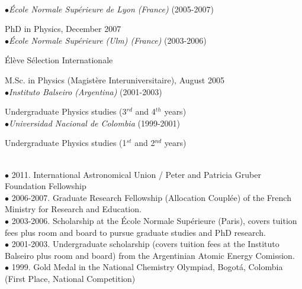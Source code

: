 \documentclass[10pt]{article}
\begin{document}
\\
\noindent\makebox[\linewidth]{\rule{\textwidth}{0.4pt}}%

\noindent$\bullet$\emph{\'Ecole Normale Sup\'erieure de Lyon (France)} (2005-2007)

PhD in Physics, December 2007\\

\noindent$\bullet$\emph{\'Ecole Normale Sup\'erieure (Ulm) (France)} (2003-2006)

  \'El\`eve S\'election Internationale

  M.Sc. in Physics (Magist\`ere Interuniversitaire), August 2005\\
  


\noindent$\bullet$\emph{Instituto Balseiro (Argentina)} (2001-2003)

  Undergraduate Physics studies (3$^{rd}$ and 4$^{th}$ years)\\

\noindent$\bullet$\emph{Universidad Nacional de Colombia} (1999-2001)

  Undergraduate Physics studies (1$^{st}$ and 2$^{nd}$ years)\\

\\
\noindent\makebox[\linewidth]{\rule{\textwidth}{0.4pt}}%


\noindent$\bullet$ 2011. International Astronomical Union / Peter and Patricia Gruber Foundation Fellowship\\

\noindent$\bullet$ 2006-2007. Graduate Research Fellowship (Allocation Coupl\'ee) of the French Ministry for Research and Education.\\

\noindent$\bullet$ 2003-2006. Scholarship at the \'Ecole Normale Sup\'erieure (Paris), covers tuition fees plus room and board to pursue graduate studies and PhD research. \\

\noindent$\bullet$ 2001-2003. Undergraduate scholarship (covers tuition fees at the Instituto Balseiro plus room and board) from the Argentinian Atomic Energy
  Comission. \\

\noindent$\bullet$ 1999. Gold Medal in the National Chemistry Olympiad, Bogot\'a, Colombia (First Place, National Competition)\\
\end{document}
